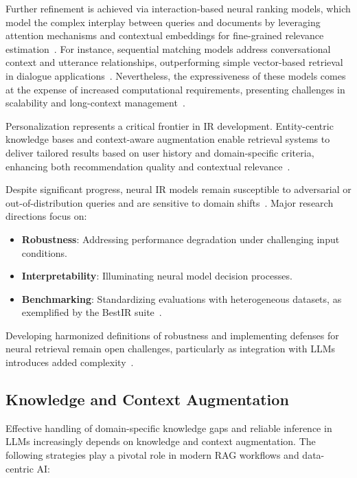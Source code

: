 \documentclass[sigconf]{acmart}
\begin{document}
Further refinement is achieved via interaction-based neural ranking models, which model the complex interplay between queries and documents by leveraging attention mechanisms and contextual embeddings for fine-grained relevance estimation~\cite{ref5,ref8,ref10,ref14,ref15,ref16,ref17,ref22,ref26,ref28,ref36,ref37,ref38,ref43,ref52,ref54,ref55}. For instance, sequential matching models address conversational context and utterance relationships, outperforming simple vector-based retrieval in dialogue applications~\cite{ref43}. Nevertheless, the expressiveness of these models comes at the expense of increased computational requirements, presenting challenges in scalability and long-context management~\cite{ref54,ref55}.

Personalization represents a critical frontier in IR development. Entity-centric knowledge bases and context-aware augmentation enable retrieval systems to deliver tailored results based on user history and domain-specific criteria, enhancing both recommendation quality and contextual relevance~\cite{ref8,ref10,ref14,ref15,ref17,ref26,ref28,ref38,ref43,ref52,ref54}.

Despite significant progress, neural IR models remain susceptible to adversarial or out-of-distribution queries and are sensitive to domain shifts~\cite{ref7,ref20,ref46,ref54,ref63,ref64}. Major research directions focus on:

\begin{itemize}
  \item \textbf{Robustness}: Addressing performance degradation under challenging input conditions.
  \item \textbf{Interpretability}: Illuminating neural model decision processes.
  \item \textbf{Benchmarking}: Standardizing evaluations with heterogeneous datasets, as exemplified by the BestIR suite~\cite{ref7,ref63,ref64}.
\end{itemize}

Developing harmonized definitions of robustness and implementing defenses for neural retrieval remain open challenges, particularly as integration with LLMs introduces added complexity~\cite{ref7,ref63,ref64}.

\subsection{Knowledge and Context Augmentation}

Effective handling of domain-specific knowledge gaps and reliable inference in LLMs increasingly depends on knowledge and context augmentation. The following strategies play a pivotal role in modern RAG workflows and data-centric AI:
\end{document}

